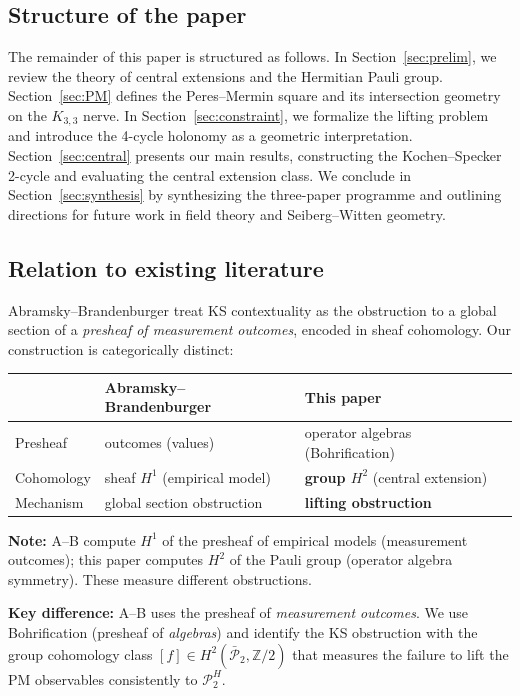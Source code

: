 \documentclass[11pt]{article}
\begin{document}
\subsection{Structure of the paper}

The remainder of this paper is structured as follows. In Section~\ref{sec:prelim}, we review the theory of central extensions and the Hermitian Pauli group. Section~\ref{sec:PM} defines the Peres--Mermin square and its intersection geometry on the $K_{3,3}$ nerve. In Section~\ref{sec:constraint}, we formalize the lifting problem and introduce the 4-cycle holonomy as a geometric interpretation. Section~\ref{sec:central} presents our main results, constructing the Kochen--Specker 2-cycle and evaluating the central extension class. We conclude in Section~\ref{sec:synthesis} by synthesizing the three-paper programme and outlining directions for future work in field theory and Seiberg--Witten geometry.

\subsection{Relation to existing literature}

Abramsky--Brandenburger \cite{AB11} treat KS contextuality as the
obstruction to a global section of a \emph{presheaf of measurement
outcomes}, encoded in sheaf cohomology. Our construction is categorically
distinct:

\begin{center}
\renewcommand{\arraystretch}{1.4}
\begin{tabular}{lll}
\toprule
& Abramsky--Brandenburger & \textbf{This paper} \\
\midrule
Presheaf & outcomes (values) & operator algebras (Bohrification) \\
Cohomology & sheaf $H^1$ (empirical model) & \textbf{group $H^2$} (central extension) \\
Mechanism & global section obstruction & \textbf{lifting obstruction} \\
\bottomrule
\end{tabular}
\end{center}

\textbf{Note:} A--B compute $H^1$ of the presheaf of empirical models (measurement outcomes);
this paper computes $H^2$ of the Pauli group (operator algebra symmetry).
These measure different obstructions.

\textbf{Key difference:} A--B uses the presheaf of \emph{measurement outcomes}.
We use Bohrification (presheaf of \emph{algebras}) and identify the KS
obstruction with the group cohomology class $[f] \in H^2(\bar{\mathcal{P}}_2, \mathbb{Z}/2)$
that measures the failure to lift the PM observables consistently to $\mathcal{P}_2^H$.
\end{document}
